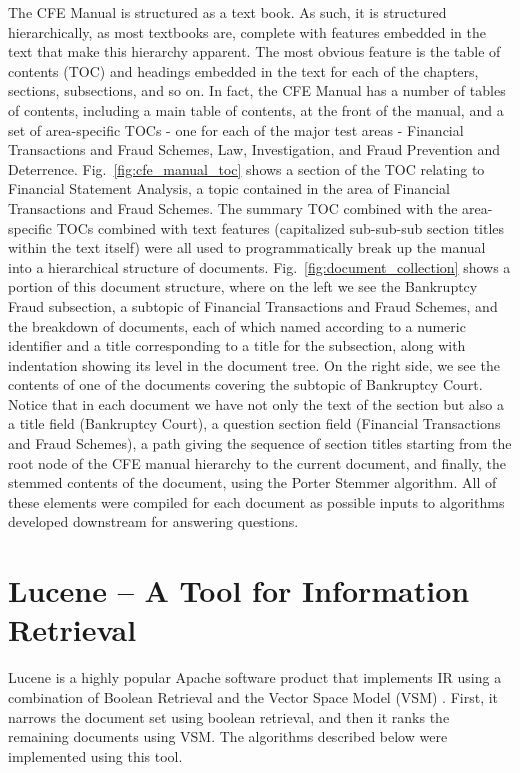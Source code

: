 The CFE Manual is structured as a text book. As such, it is structured hierarchically, as most textbooks are, complete with features embedded in the text that make this hierarchy apparent.  The most obvious feature is the table of contents (TOC) and headings embedded in the text for each of the chapters, sections, subsections, and so on.  In fact, the CFE Manual has a number of tables of contents, including a main table of contents, at the front of the manual, and a set of area-specific TOCs - one for each of the major test areas - Financial Transactions and Fraud Schemes, Law, Investigation, and Fraud Prevention and Deterrence.  Fig.~\ref{fig:cfe_manual_toc} shows a section of the TOC relating to Financial Statement Analysis, a topic contained in the area of Financial Transactions and Fraud Schemes.  The summary TOC combined with the area-specific TOCs combined with text features (capitalized sub-sub-sub section titles within the text itself) were all used to programmatically break up the manual into a hierarchical structure of documents.  Fig.~\ref{fig:document_collection} shows a portion of this document structure, where on the left we see the Bankruptcy Fraud subsection, a subtopic of Financial Transactions and Fraud Schemes, and the breakdown of documents, each of which named according to a numeric identifier and a title corresponding to a title for the subsection, along with indentation showing its level in the document tree.  On the right side, we see the contents of one of the documents covering the subtopic of Bankruptcy Court.  Notice that in each document we have not only the text of the section but also a a title field (Bankruptcy Court), a question section field (Financial Transactions and Fraud Schemes), a path giving the sequence of section titles starting from the root node of the CFE manual hierarchy to the current document, and finally, the stemmed contents of the document, using the Porter Stemmer algorithm.  All of these elements were compiled for each document as possible inputs to algorithms developed downstream for answering questions.  

\section{Lucene -- A Tool for Information Retrieval}

Lucene \cite{lucene} is a highly popular Apache software product that implements IR using a combination of Boolean Retrieval and the Vector Space Model (VSM) \cite{McCandless:2010:LAS:1893016_ch1,McCandless:2010:LAS:1893016_ch2,McCandless:2010:LAS:1893016_ch3,McCandless:2010:LAS:1893016_ch4}.  First, it narrows the document set using boolean retrieval, and then it ranks the remaining documents using VSM.  The algorithms described below were implemented using this tool.  

